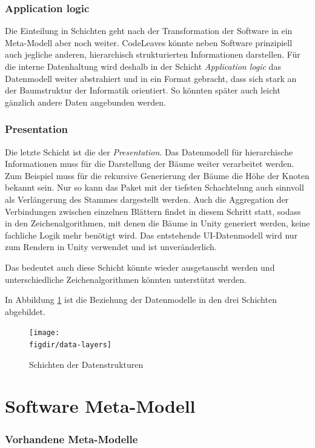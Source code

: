 \subsubsection*{Application logic}
Die Einteilung in Schichten geht nach der Transformation der Software in ein Meta-Modell aber noch weiter. CodeLeaves könnte neben Software prinzipiell auch jegliche anderen, hierarchisch strukturierten Informationen darstellen. Für die interne Datenhaltung wird deshalb in der Schicht \textit{Application logic} das Datenmodell weiter abstrahiert und in ein Format gebracht, dass sich stark an der Baumstruktur der Informatik orientiert. So könnten später auch leicht gänzlich andere Daten angebunden werden.

\subsubsection*{Presentation}
Die letzte Schicht ist die der \textit{Presentation}. Das Datenmodell für hierarchische Informationen muss für die Darstellung der Bäume weiter verarbeitet werden. Zum Beispiel muss für die rekursive Generierung der Bäume die Höhe der Knoten bekannt sein. Nur so kann das Paket mit der tiefsten Schachtelung auch sinnvoll als Verlängerung des Stammes dargestellt werden. Auch die Aggregation der Verbindungen zwischen einzelnen Blättern findet in diesem Schritt statt, sodass in den Zeichenalgorithmen, mit denen die Bäume in Unity generiert werden, keine fachliche Logik mehr benötigt wird. Das entstehende UI-Datenmodell wird nur zum Rendern in Unity verwendet und ist unveränderlich.

Das bedeutet auch diese Schicht könnte wieder ausgetauscht werden und unterschiedliche Zeichenalgorithmen könnten unterstützt werden.

In Abbildung \ref{fig:data-layers} ist die Beziehung der Datenmodelle in den drei Schichten abgebildet.

\begin{figure}[htb]
  \texttt{[image: \\figdir/data-layers]}
  \caption{Schichten der Datenstrukturen}
  \label{fig:data-layers}
\end{figure}

\section{Software Meta-Modell}
\label{sec:software-model}

\subsubsection*{Vorhandene Meta-Modelle}

